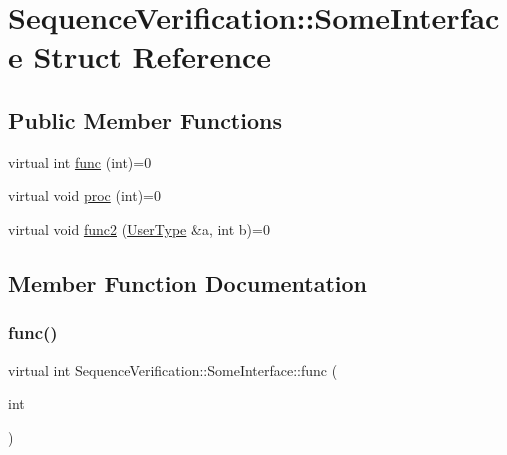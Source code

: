 \hypertarget{structSequenceVerification_1_1SomeInterface}{}\section{Sequence\+Verification\+::Some\+Interface Struct Reference}
\label{structSequenceVerification_1_1SomeInterface}
\subsection*{Public Member Functions}
\begin{DoxyCompactItemize}
\item 
virtual int \mbox{\hyperlink{structSequenceVerification_1_1SomeInterface_abae9bacb91a2386a9a45daaeb5533e87}{func}} (int)=0
\item 
virtual void \mbox{\hyperlink{structSequenceVerification_1_1SomeInterface_abb42f58108f4abc5460603b6e6730966}{proc}} (int)=0
\item 
virtual void \mbox{\hyperlink{structSequenceVerification_1_1SomeInterface_ae28a0b1df171fde7041bec25bd78da45}{func2}} (\mbox{\hyperlink{classSequenceVerification_1_1UserType}{User\+Type}} \&a, int b)=0
\end{DoxyCompactItemize}


\subsection{Member Function Documentation}
\mbox{\label{structSequenceVerification_1_1SomeInterface_abae9bacb91a2386a9a45daaeb5533e87}} 
\subsubsection{\texorpdfstring{func()}{func()}}
{\footnotesize\ttfamily virtual int Sequence\+Verification\+::\+Some\+Interface\+::func (\begin{DoxyParamCaption}\item[{int}]{ }\end{DoxyParamCaption})\hspace{0.3cm}{\ttfamily [pure virtual]}}

\mbox{\label{structSequenceVerification_1_1SomeInterface_ae28a0b1df171fde7041bec25bd78da45}} 
